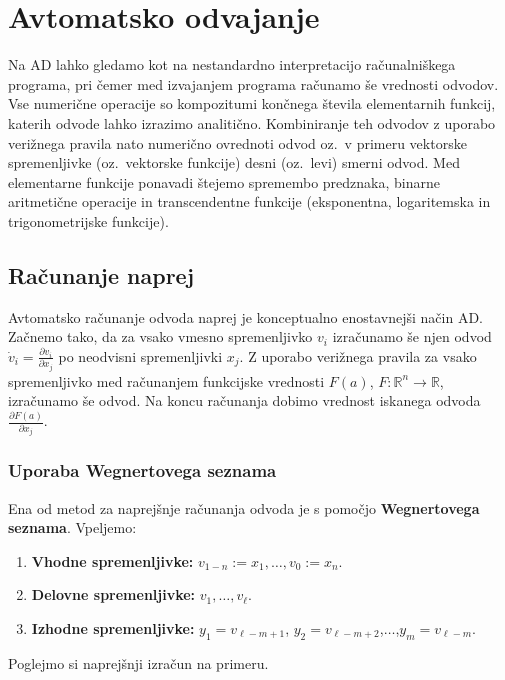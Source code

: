 \documentclass[12pt,slovene]{article}
\newcommand{\RR}{\mathbb R}
\begin{document}
\section{Avtomatsko odvajanje}

Na AD lahko gledamo kot na nestandardno interpretacijo računalniškega programa, pri čemer med izvajanjem programa računamo še vrednosti odvodov. Vse numerične operacije so kompozitumi končnega števila elementarnih funkcij, katerih odvode lahko izrazimo analitično. Kombiniranje teh odvodov z uporabo verižnega pravila nato numerično ovrednoti odvod oz.\ v primeru vektorske spremenljivke (oz.\ vektorske funkcije)  desni (oz.\ levi) smerni odvod. Med elementarne funkcije ponavadi štejemo spremembo predznaka, binarne aritmetične operacije in transcendentne funkcije (eksponentna, logaritemska in trigonometrijske funkcije).


\subsection{Računanje naprej}

Avtomatsko računanje odvoda naprej je konceptualno enostavnejši način AD. 
Začnemo tako, da za vsako vmesno spremenljivko $v_i$ 
izračunamo še njen odvod $\dot{v}_i=\frac{\partial v_i}{\partial x_j}$ po neodvisni spremenljivki $x_j$.
Z uporabo verižnega pravila za vsako spremenljivko med računanjem funkcijske vrednosti $F(a)$, $F:\RR^n\to \RR$, izračunamo še odvod. Na koncu računanja dobimo vrednost iskanega odvoda 
$\frac{\partial F(a)}{\partial x_j}$.

\subsubsection{Uporaba Wegnertovega seznama}
Ena od metod za naprejšnje računanja odvoda je s pomočjo \textbf{Wegnertovega seznama}.
Vpeljemo:
\begin{enumerate}
    \item \textbf{Vhodne spremenljivke:}
$v_{1-n}:=x_{1},\ldots,v_{0}:=x_n$.
    \item
\textbf{Delovne spremenljivke:}
    $v_{1},\ldots,v_\ell$. 
    \item 
\textbf{Izhodne spremenljivke:}
$y_{1}=v_{\ell-m+1}$, $y_{2}=v_{\ell-m+2}$,$\ldots$,$y_m=v_{\ell-m}$.
\end{enumerate}

Poglejmo si naprejšnji izračun na primeru.
\end{document}
